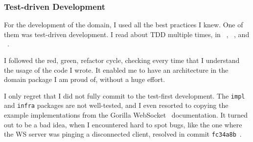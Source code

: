 \subsubsection{Test-driven Development}\label{sec:test-driven-development}

For the development of the domain,
I used all the best practices I knew.
One of them was test-driven development.
I read about \ac{TDD} multiple times, in
~\cite{beck_test-driven_2002},
~\cite{martin_clean_2011}, and
~\cite{beck_extreme_2004}.

I followed the red, green, refactor cycle,
checking every time that I understand
the usage of the code I wrote.
It enabled me to have an architecture
in the domain package I am proud of,
without a huge effort.

I only regret that
I did not fully commit to the test-first development.
The \texttt{impl} and \texttt{infra} packages
are not well-tested,
and I even resorted to copying the example implementations
from the Gorilla WebSocket~\cite{burd_gorilla_2022} documentation.
It turned out to be a bad idea,
when I encountered hard to spot bugs,
like the one
where the \ac{WS} server
was pinging a disconnected client,
resolved in commit \texttt{fc34a8b}~.

